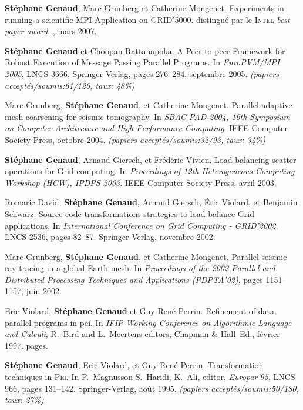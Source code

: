\documentclass[11pt]{article}
\begin{document}
\begin{thebibliography}{99}
\newblock \textbf{Stéphane Genaud}, Marc Grunberg et Catherine Mongenet.
\newblock Experiments in running a scientific {MPI} Application on GRID'5000. 
\newblock distingué par le \textsc{Intel} \textit{best paper award}.
, mars 2007.


\textbf{Stéphane Genaud} et Choopan Rattanapoka.
\newblock A Peer-to-peer Framework for Robust Execution of Message Passing 
Parallel Programs.
\newblock 
In {\em EuroPVM/MPI 2005}, LNCS 3666, Springer-Verlag, pages 276--284, 
septembre 2005.
\newblock \small{\textit{(papiers acceptés/soumis:61/126, taux: 48\%)}}


Marc Grunberg, \textbf{Stéphane Genaud}, et Catherine Mongenet.
\newblock Parallel adaptive mesh coarsening for seismic tomography.
\newblock In {\em SBAC-PAD 2004, 16th Symposium on Computer Architecture and
  High Performance Computing}. IEEE Computer Society Press, octobre 2004.
\newblock \small{\textit{(papiers acceptés/soumis:32/93, taux: 34\%)}}

\textbf{Stéphane Genaud}, Arnaud Giersch, et Frédéric Vivien.
\newblock Load-balancing scatter operations for Grid computing.
\newblock In {\em Proceedings of 12th Heterogeneous Computing Workshop 
(HCW), IPDPS 2003}. IEEE Computer Society Press, avril 2003.

Romaric David, \textbf{Stéphane Genaud}, Arnaud Giersch, \'{E}ric Violard, et 
  Benjamin Schwarz.
\newblock Source-code transformations strategies to load-balance Grid
  applications.
\newblock In {\em International Conference on Grid Computing - GRID'2002}, 
LNCS 2536, pages 82--87. Springer-Verlag, novembre 2002.

Marc Grunberg, \textbf{Stéphane Genaud}, et Catherine Mongenet.
\newblock Parallel seismic ray-tracing in a global {E}arth mesh.
\newblock In {\em Proceedings of the 2002 Parallel and Distributed Processing
  Techniques and Applications (PDPTA'02)}, pages 1151--1157, juin 2002.

Eric Violard, \textbf{Stéphane Genaud} et Guy-René Perrin.
\newblock Refinement of data-parallel programs in pei.
\newblock In {\em IFIP Working Conference on Algorithmic Language and Calculi}, 
R.~Bird and L.~Meertens editors, Chapman \& Hall~Ed., février 1997.
 pages.

\textbf{Stéphane Genaud}, Eric Violard, et Guy-René Perrin.
\newblock Transformation techniques in \textsc{Pei}.
\newblock In P.~Magnusson S.~Haridi, K.~Ali, editor, {\em Europar'95}, LNCS
  966, pages 131--142. Springer-Verlag, août 1995.
\newblock \small{\textit{(papiers acceptés/soumis:50/180, taux: 27\%)}}





\end{thebibliography}
\end{document}

